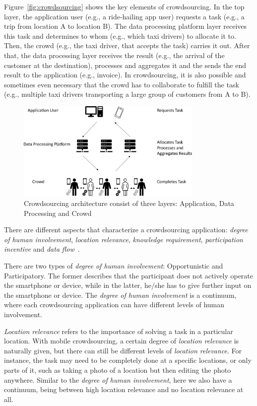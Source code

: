 Figure~\ref{fig:crowdsourcing} shows the key elements of crowdsourcing.
In the top layer, the application user (e.g., a ride-hailing app user) requests a task (e.g., a trip from location A to location B).
The data processing platform layer receives this task and determines to whom (e.g., which taxi drivers) to allocate it to.
Then, the crowd (e.g., the taxi driver, that accepts the task) carries it out.
After that, the data processing layer receives the result (e.g., the arrival of the customer at the destination), processes and aggregates it and the sends the end result to the application (e.g., invoice).
In crowdsourcing, it is also possible and sometimes even necessary that the crowd has to collaborate to fulfill the task (e.g., multiple taxi drivers transporting a large group of customers from A to B).

\begin{figure}[htbp]
  \centering
  \includegraphics[width=0.8\textwidth]{fig/crowdsourcing.pdf}
  \caption{Crowdsourcing architecture consist of three layers: Application, Data Processing and Crowd}
\end{figure}
\label{fig:crowdsourcing}

There are different aspects that characterize a crowdsourcing application: \textit{degree of human involvement}, \textit{location relevance}, \textit{knowledge requirement}, \textit{participation incentive} and \textit{data flow}~\cite{ray2023survey,kong2019mobile}.

There are two types of \textit{degree of human involvement}: Opportunistic and Participatory.
The former describes that the participant does not actively operate the smartphone or device, while in the latter, he/she has to give further input on the smartphone or device.
The \textit{degree of human involvement} is a continuum, where each crowdsourcing application can have different levels of human involvement.

\textit{Location relevance} refers to the importance of solving a task in a particular location.
With mobile crowdsourcing, a certain degree of \textit{location relevance} is naturally given, but there can still be different levels of \textit{location relevance}.
For instance, the task may need to be completely done at a specific locations, or only parts of it, such as taking a photo of a location but then editing the photo anywhere.
Similar to the \textit{degree of human involvement}, here we also have a continuum, being between high location relevance and no location relevance at all.

